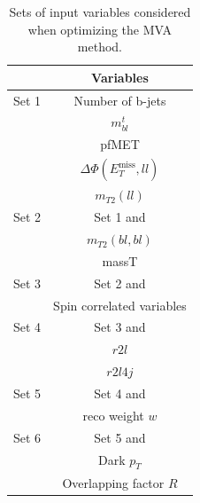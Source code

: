 \documentclass[a4paper, 10pt, openright]{report}
\begin{document}
\begin{appendices}
\begin{table}
\begin{center}
\begin{tabular}{ c|c } 
 \hline
  & Variables \\
\hline
\multirow{1}{*}{Set 1} & Number of b-jets \\
& $m_{bl}^t$ \\
& pf\ac{MET} \\
& $\Delta \Phi(E_{T}^{\text{miss}}, ll)$ \\
& $m_{T2}(ll)$ \\
\hline
Set 2 & Set 1 and \\
& $m_{T2}(bl, bl)$ \\
& massT \\
\hline
Set 3 & Set 2 and \\
& Spin correlated variables \\
\hline
Set 4 & Set 3 and \\
& $r2l$ \\
& $r2l4j$ \\
\hline
Set 5 & Set 4 and \\
& reco weight $w$ \\
\hline
Set 6 & Set 5 and \\
& Dark $p_T$ \\
& Overlapping factor $R$ \\
 \hline
\end{tabular}
\caption{Sets of input variables considered when optimizing the \ac{MVA} method.}
\label{table:sets}
\end{center}
\end{table}

%


\end{appendices}
\end{document}
